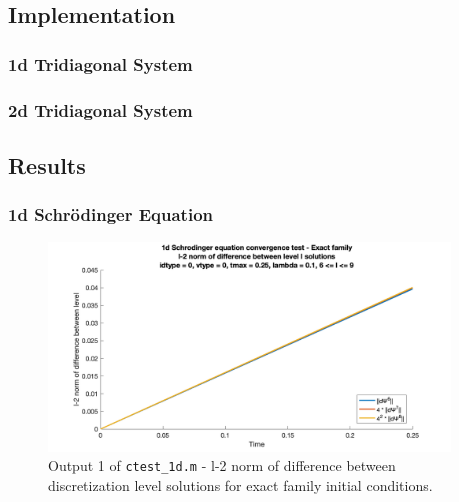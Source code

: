 \documentclass[10pt]{article}
\def\code#1{\texttt{#1}} %
\begin{document}


\subsection*{Implementation}

\subsubsection*{1d Tridiagonal System}


\subsubsection*{2d Tridiagonal System}


\subsection*{Results}

\subsubsection*{1d Schrödinger Equation}


\begin{figure}[H]
\centering
\includegraphics[width=0.95\textwidth]{problem1/ctest_1d-1.png}
\caption{Output 1 of \code{ctest\_1d.m} - 
l-2 norm of difference between discretization level solutions for exact family initial conditions.}
\end{figure}
\end{document}

